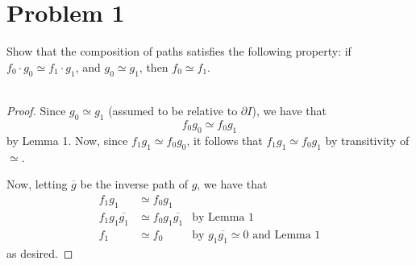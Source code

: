 \documentclass[fontsize=11pt]{scrartcl} %
\numberwithin{equation}{section} %
\numberwithin{figure}{section} %
\numberwithin{table}{section} %
\begin{document}
\section*{Problem 1}
Show that the composition of paths satisfies the following property: if 
$f_0\cdot g_0 \simeq f_1\cdot g_1$, and $g_0\simeq g_1$, then $f_0\simeq f_1$.
\\
\\
\begin{proof}
%
%

    Since $g_0\simeq g_1$ (assumed to be relative to $\partial I$), we have that
    \[
        f_0g_0\simeq f_0g_1
    \]
    by Lemma 1. Now, since $f_1g_1\simeq f_0g_0$, it follows that $f_1g_1\simeq
    f_0g_1$ by transitivity of $\simeq$.

    Now, letting $\overline{g}$ be the inverse path of $g$, we have that
    \[
        \begin{aligned}
            f_1g_1&\simeq f_0g_1\\
            f_1g_1\overline{g_1} &\simeq f_0g_1\overline{g_1} &\text{by Lemma
            1}\\
            f_1 &\simeq f_0 &\text{by $g_1\overline{g_1}\simeq 0$ and Lemma 1}
        \end{aligned}
    \]
    as desired.
\end{proof}
\end{document}
